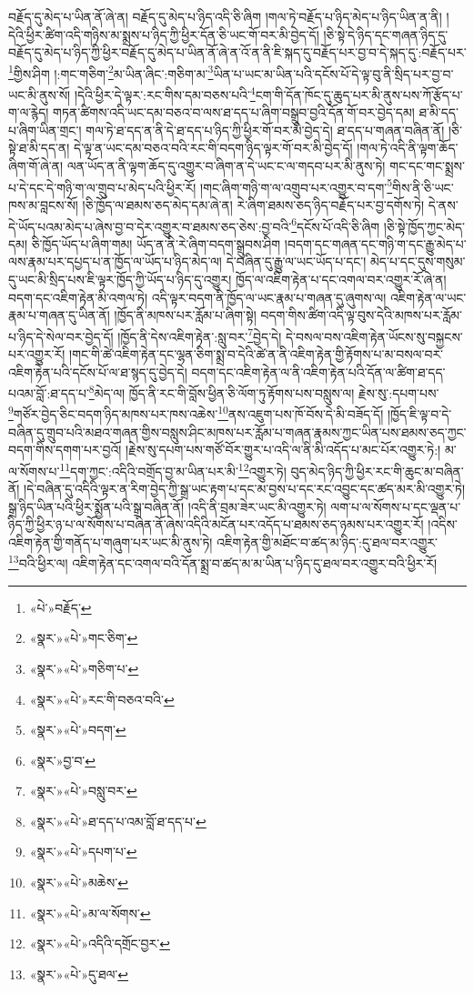 བརྗོད་དུ་མེད་པ་ཡིན་ནོ་ཞེ་ན། བརྗོད་དུ་མེད་པ་ཉིད་འདི་ཅི་ཞིག །གལ་ཏེ་བརྗོད་པ་ཉིད་མེད་པ་ཉིད་ཡིན་ན་ནི། །དེའི་ཕྱིར་ཚིག་འདི་གཉིས་མ་སྨྲས་པ་ཉིད་ཀྱི་ཕྱིར་དོན་ཅི་ཡང་གོ་བར་མི་བྱེད་དོ། །ཅི་སྟེ་དེ་ཉིད་དང་གཞན་ཉིད་དུ་བརྗོད་དུ་མེད་པ་ཉིད་ཀྱི་ཕྱིར་བརྗོད་དུ་མེད་པ་ཡིན་ནོ་ཞེ་ན་འོ་ན་ནི་ཇི་སྐད་དུ་བརྗོད་པར་བྱ་བ་དེ་སྐད་དུ་:བརྗོད་པར་\footnote{«པེ་»བརྗོད་}གྱིས་ཤིག །:གང་གཅིག་\footnote{«སྣར་»«པེ་»གང་ཅིག་}མ་ཡིན་ཞིང་:གཅིག་མ་\footnote{«སྣར་»«པེ་»གཅིག་པ་}ཡིན་པ་ཡང་མ་ཡིན་པའི་དངོས་པོ་དེ་ལྟ་བུ་ནི་སྲིད་པར་བྱ་བ་ཡང་མི་ནུས་སོ། །དེའི་ཕྱིར་དེ་ལྟར་:རང་གིས་དམ་བཅས་པའི་\footnote{«སྣར་»«པེ་»རང་གི་བཅའ་བའི་}ངག་གི་དོན་ཁོང་དུ་ཆུད་པར་མི་ནུས་པས་ཀོ་རྩོད་པ་ག་ལ་རྙེད། གཏན་ཚིགས་འདི་ཡང་དམ་བཅའ་བ་ལས་ཐ་དད་པ་ཞིག་བསྒྲུབ་བྱའི་དོན་གོ་བར་བྱེད་དམ། ཐ་མི་དད་པ་ཞིག་ཡིན་གྲང་། གལ་ཏེ་ཐ་དད་ན་ནི་དེ་ཐ་དད་པ་ཉིད་ཀྱི་ཕྱིར་གོ་བར་མི་བྱེད་དེ། ཐ་དད་པ་གཞན་བཞིན་ནོ། །ཅི་སྟེ་ཐ་མི་དད་ན། དེ་ལྟ་ན་ཡང་དམ་བཅའ་བའི་རང་གི་བདག་ཉིད་ལྟར་གོ་བར་མི་བྱེད་དོ། །གལ་ཏེ་འདི་ནི་ལྟག་ཆོད་ཞིག་གོ་ཞེ་ན། ལན་ཡོད་ན་ནི་ལྟག་ཆོད་དུ་འགྱུར་བ་ཞིག་ན་དེ་ཡང་ང་ལ་གདབ་པར་མི་ནུས་ཏེ། གང་དང་གང་སྨྲས་པ་དེ་དང་དེ་གཉི་ག་ལ་གྲུབ་པ་མེད་པའི་ཕྱིར་རོ། །གང་ཞིག་གཉི་ག་ལ་འགྲུབ་པར་འགྱུར་བ་དག་\footnote{«སྣར་»«པེ་»བདག་}གིས་ནི་ཅི་ཡང་ཁས་མ་བླངས་སོ། །ཅི་ཁྱོད་ལ་ཐམས་ཅད་མེད་དམ་ཞེ་ན། རེ་ཞིག་ཐམས་ཅད་ཉིད་བརྗོད་པར་བྱ་དགོས་ཏེ། དེ་ནས་དེ་ཡོད་པའམ་མེད་པ་ཞེས་བྱ་བ་དེར་འགྱུར་བ་ཐམས་ཅད་ཅེས་:བྱ་བའི་\footnote{«སྣར་»བྱ་བ་}དངོས་པོ་འདི་ཅི་ཞིག །ཅི་སྟེ་ཁྱོད་ཀྱང་མེད་དམ། ཅི་ཁྱོད་ཡོད་པ་ཞིག་གམ། ཡོད་ན་ནི་རེ་ཞིག་བདག་སྒྲུབས་ཤིག །བདག་དང་གཞན་དང་གཉི་ག་དང་རྒྱུ་མེད་པ་ལས་རྣམ་པར་དཔྱད་པ་ན་ཁྱོད་ལ་ཡོད་པ་ཉིད་མེད་ལ། དེ་བཞིན་དུ་རྒྱུ་ལ་ཡང་ཡོད་པ་དང་། མེད་པ་དང་དུས་གསུམ་དུ་ཡང་མི་སྲིད་པས་ཇི་ལྟར་ཁྱོད་ཀྱི་ཡོད་པ་ཉིད་དུ་འགྱུར། ཁྱོད་ལ་འཇིག་རྟེན་པ་དང་འགལ་བར་འགྱུར་རོ་ཞེ་ན། བདག་དང་འཇིག་རྟེན་མི་འགལ་ཏེ། འདི་ལྟར་བདག་ནི་ཁྱོད་ལ་ཡང་རྣམ་པ་གཞན་དུ་ཞུགས་ལ། འཇིག་རྟེན་ལ་ཡང་རྣམ་པ་གཞན་དུ་ཡིན་ནོ། །ཁྱོད་ནི་མཁས་པར་རློམ་པ་ཞིག་སྟེ། བདག་གིས་ཚིག་འདི་ལྟ་བུས་དེའི་མཁས་པར་རློམ་པ་ཉིད་དེ་སེལ་བར་བྱེད་དོ། །ཁྱོད་ནི་དེས་འཇིག་རྟེན་:སླུ་བར་\footnote{«སྣར་»«པེ་»བསླུ་བར་}བྱེད་དེ། དེ་བསལ་བས་འཇིག་རྟེན་ཡོངས་སུ་བསྐྱངས་པར་འགྱུར་རོ། །གང་གི་ཚེ་འཇིག་རྟེན་དང་ལྷན་ཅིག་སྨྲ་བ་དེའི་ཚེ་ན་ནི་འཇིག་རྟེན་གྱི་རྟོགས་པ་མ་བསལ་བར་འཇིག་རྟེན་པའི་དངོས་པོ་ལ་ཐ་སྙད་དུ་བྱེད་དེ། བདག་དང་འཇིག་རྟེན་ལ་ནི་འཇིག་རྟེན་པའི་དོན་ལ་ཚིག་ཐ་དད་པའམ་བློ་:ཐ་དད་པ་\footnote{«སྣར་»«པེ་»ཐ་དད་པ་འམ་བློ་ཐ་དད་པ་}མེད་ལ། ཁྱོད་ནི་རང་གི་བློས་ཕྱིན་ཅི་ལོག་ཏུ་རྟོགས་པས་བསླུས་ལ། རྗེས་སུ་:དཔག་པས་\footnote{«སྣར་»«པེ་»དཔག་པ་}གཙོར་བྱེད་ཅིང་བདག་ཉིད་མཁས་པར་ཁས་འཆེས་\footnote{«སྣར་»«པེ་»མཆེས་}ནས་འཇུག་པས་ཁོ་བོས་དེ་མི་བཟོད་དོ། །ཁྱོད་ཇི་ལྟ་བ་དེ་བཞིན་དུ་གྲུབ་པའི་མཐའ་གཞན་གྱིས་བསླུས་ཤིང་མཁས་པར་རློམ་པ་གཞན་རྣམས་ཀྱང་ཡིན་པས་ཐམས་ཅད་ཀྱང་བདག་གིས་དགག་པར་བྱའོ། །རྗེས་སུ་དཔག་པས་གཙོ་བོར་གྱུར་པ་འདི་ལ་ནི་མི་འདོད་པ་མང་པོར་འགྱུར་ཏེ:། མ་ལ་སོགས་པ་\footnote{«སྣར་»«པེ་»མ་ལ་སོགས་}དག་ཀྱང་:འདིའི་བགྲོད་བྱ་མ་ཡིན་པར་མི་\footnote{«སྣར་»«པེ་»འདིའི་དགྲོང་བྱར་}འགྱུར་ཏེ། བུད་མེད་ཉིད་ཀྱི་ཕྱིར་རང་གི་ཆུང་མ་བཞིན་ནོ། །དེ་བཞིན་དུ་འདིའི་ལྟར་ན་རིག་བྱེད་ཀྱི་སྒྲ་ཡང་རྟག་པ་དང་མ་བྱས་པ་དང་རང་འབྱུང་དང་ཚད་མར་མི་འགྱུར་ཏེ། སྒྲ་ཉིད་ཡིན་པའི་ཕྱིར་སྨྱོན་པའི་སྒྲ་བཞིན་ནོ། །འདི་ནི་བྲམ་ཟེར་ཡང་མི་འགྱུར་ཏེ། ལག་པ་ལ་སོགས་པ་དང་ལྡན་པ་ཉིད་ཀྱི་ཕྱིར་ཉ་པ་ལ་སོགས་པ་བཞིན་ནོ་ཞེས་འདིའི་མངོན་པར་འདོད་པ་ཐམས་ཅད་ཉམས་པར་འགྱུར་རོ། །འདིས་འཇིག་རྟེན་གྱི་གནོད་པ་གཞུག་པར་ཡང་མི་ནུས་ཏེ། འཇིག་རྟེན་གྱི་མཐོང་བ་ཚད་མ་ཉིད་:དུ་ཐལ་བར་འགྱུར་\footnote{«སྣར་»«པེ་»དུ་ཐལ་}བའི་ཕྱིར་ལ། འཇིག་རྟེན་དང་འགལ་བའི་དོན་སྨྲ་བ་ཚད་མ་མ་ཡིན་པ་ཉིད་དུ་ཐལ་བར་འགྱུར་བའི་ཕྱིར་རོ། 